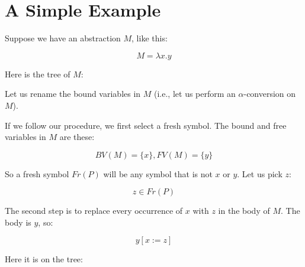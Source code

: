 \documentclass{book}
\numberwithin{equation}{chapter}
\begin{document}
\section{A Simple Example}

Suppose we have an abstraction $M$, like this:

\begin{equation}
M = \lambda x.y
\end{equation}

\noindent
Here is the tree of $M$:

\begin{center}
\end{center}

\noindent
Let us rename the bound variables in $M$ (i.e., let us perform an $\alpha$-conversion on $M$). 

If we follow our procedure, we first select a fresh symbol. The bound and free variables in $M$ are these:

\begin{equation}
BV(M) = \{ x \}, FV(M) = \{ y \}
\end{equation}

\noindent
So a fresh symbol $Fr(P)$ will be any symbol that is not $x$ or $y$. Let us pick $z$:

\begin{equation}
z \in Fr(P)
\end{equation}

\noindent
The second step is to replace every occurrence of $x$ with $z$ in the body of $M$. The body is $y$, so:

\begin{equation}
y[x := z]
\end{equation}

\noindent
Here it is on the tree:

\begin{center}
\end{center}
\end{document}
